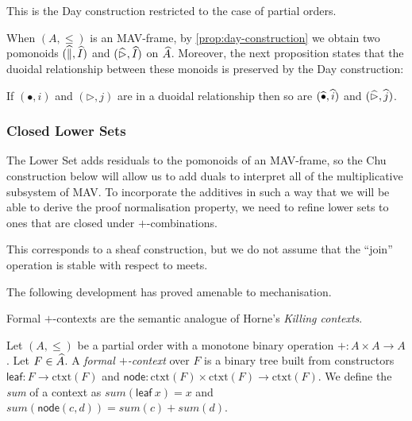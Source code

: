\begin{remark}
  This is the Day construction \cite{day} restricted to the case of
  partial orders.
\end{remark}

\begin{remark}
  When $(A, \leq)$ is an MAV-frame, by \ref{prop:day-construction} we
  obtain two pomonoids $(\mathop{\widehat{\parallel}}, \mathop{\widehat{I}})$ and
  $(\mathop{\widehat{\rhd}}, \mathop{\widehat{I}})$ on $\widehat{A}$. Moreover, the next
  proposition states that the duoidal relationship between these
  monoids is preserved by the Day construction:
\end{remark}

\begin{proposition}\label{prop:lower-set-duoidal}
  If $(\bullet, i)$ and $(\rhd, j)$ are in a duoidal relationship then
  so are $(\mathop{\widehat{\bullet}}, \mathop{\widehat{i}})$ and $(\mathop{\widehat{\rhd}}, \mathop{\widehat{j}})$.
\end{proposition}

\subsubsection{Closed Lower Sets}

The Lower Set adds residuals to the pomonoids of an MAV-frame, so the
Chu construction below will allow us to add duals to interpret all of
the multiplicative subsystem of MAV. To incorporate the additives in
such a way that we will be able to derive the proof normalisation
property, we need to refine lower sets to ones that are closed under
$+$-combinations.

This corresponds to a sheaf construction, but we do not assume that
the ``join'' operation is stable with respect to meets.

The following development has proved amenable to mechanisation.

Formal $+$-contexts are the semantic analogue of Horne's \emph{Killing
  contexts}.

\begin{definition}
  Let $(A, \leq)$ be a partial order with a monotone binary operation
  $+ : A \times A \to A$.  Let $F \in \widehat{A}$. A \emph{formal
    $+$-context} over $F$ is a binary tree built from constructors
  $\mathsf{leaf} : F \to \mathrm{ctxt}(F)$ and
  $\mathsf{node} : \mathrm{ctxt}(F) \times \mathrm{ctxt}(F) \to
  \mathrm{ctxt}(F)$. We define the \emph{sum} of a context as
  $\mathit{sum}(\mathsf{leaf}~x) = x$ and
  $\mathit{sum}(\mathsf{node}(c,d)) = \mathit{sum}(c) +
  \mathit{sum}(d)$.
\end{definition}

